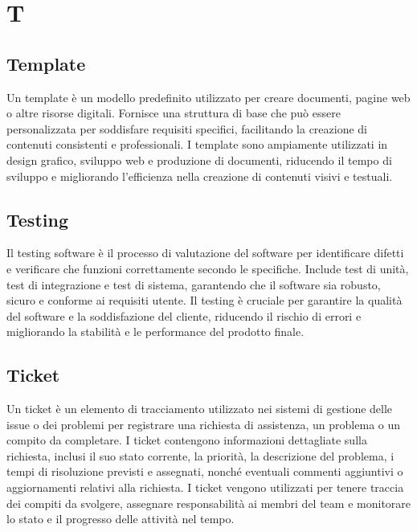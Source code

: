 \section{T}

\vspace{2em}
\subsection*{Template}
Un template è un modello predefinito utilizzato per creare documenti, pagine web o altre risorse digitali. Fornisce una struttura di base che può essere personalizzata per soddisfare requisiti specifici, facilitando la creazione di contenuti consistenti e professionali. I template sono ampiamente utilizzati in design grafico, sviluppo web e produzione di documenti, riducendo il tempo di sviluppo e migliorando l'efficienza nella creazione di contenuti visivi e testuali.

\vspace{2em}
\subsection*{Testing}
Il testing software è il processo di valutazione del software per identificare difetti e verificare che funzioni correttamente secondo le specifiche. Include test di unità, test di integrazione e test di sistema, garantendo che il software sia robusto, sicuro e conforme ai requisiti utente. Il testing è cruciale per garantire la qualità del software e la soddisfazione del cliente, riducendo il rischio di errori e migliorando la stabilità e le performance del prodotto finale.

\vspace{2em}
\subsection*{Ticket}
Un ticket è un elemento di tracciamento utilizzato nei sistemi di gestione delle issue o dei problemi per registrare una richiesta di assistenza, un problema o un compito da completare. I ticket contengono informazioni dettagliate sulla richiesta, inclusi il suo stato corrente, la priorità, la descrizione del problema, i tempi di risoluzione previsti e assegnati, nonché eventuali commenti aggiuntivi o aggiornamenti relativi alla richiesta. I ticket vengono utilizzati per tenere traccia dei compiti da svolgere, assegnare responsabilità ai membri del team e monitorare lo stato e il progresso delle attività nel tempo.

